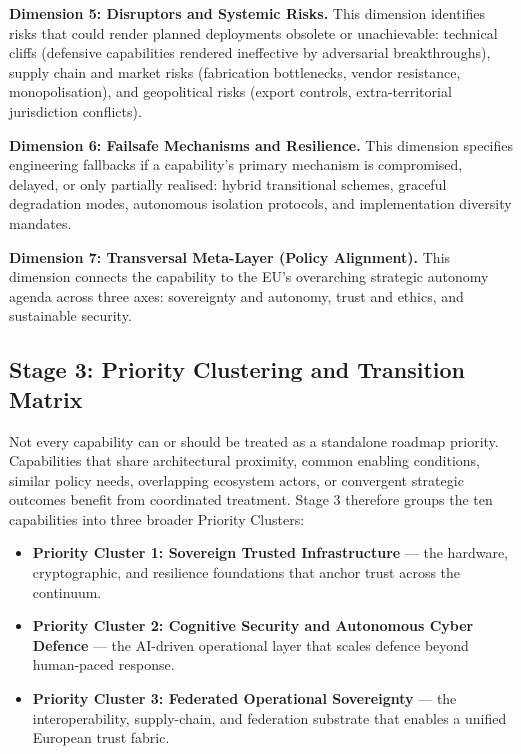 \documentclass{ieeeaccess}
\begin{document}
\textbf{Dimension 5: Disruptors and Systemic Risks.} This dimension
identifies risks that could render planned deployments obsolete or
unachievable: technical cliffs (defensive capabilities rendered
ineffective by adversarial breakthroughs), supply chain and market risks
(fabrication bottlenecks, vendor resistance, monopolisation), and
geopolitical risks (export controls, extra-territorial jurisdiction
conflicts).

\textbf{Dimension 6: Failsafe Mechanisms and Resilience.} This dimension
specifies engineering fallbacks if a capability's primary mechanism is
compromised, delayed, or only partially realised: hybrid transitional
schemes, graceful degradation modes, autonomous isolation protocols, and
implementation diversity mandates.

\textbf{Dimension 7: Transversal Meta-Layer (Policy Alignment).} This
dimension connects the capability to the EU's overarching strategic
autonomy agenda across three axes: sovereignty and autonomy, trust and
ethics, and sustainable security.

\subsection{Stage 3: Priority Clustering and Transition
Matrix}\label{stage-3-priority-clustering-and-transition-matrix}

Not every capability can or should be treated as a standalone roadmap
priority. Capabilities that share architectural proximity, common
enabling conditions, similar policy needs, overlapping ecosystem actors,
or convergent strategic outcomes benefit from coordinated treatment.
Stage 3 therefore groups the ten capabilities into three broader
Priority Clusters:

\begin{itemize}
\item
  \textbf{Priority Cluster 1: Sovereign Trusted Infrastructure} --- the
  hardware, cryptographic, and resilience foundations that anchor trust
  across the continuum.
\item
  \textbf{Priority Cluster 2: Cognitive Security and Autonomous Cyber
  Defence} --- the AI-driven operational layer that scales defence
  beyond human-paced response.
\item
  \textbf{Priority Cluster 3: Federated Operational Sovereignty} --- the
  interoperability, supply-chain, and federation substrate that enables
  a unified European trust fabric.
\end{itemize}
\end{document}
